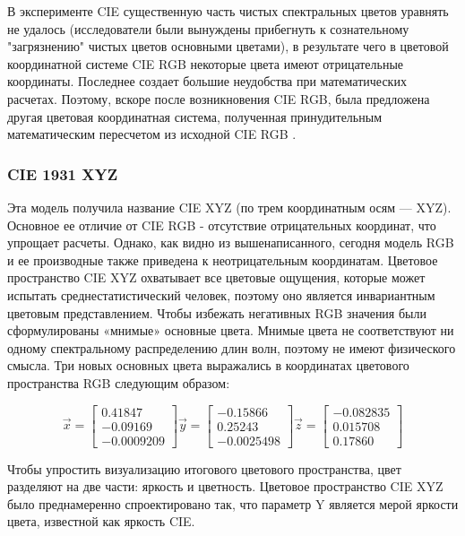 В эксперименте CIE существенную часть чистых спектральных цветов
уравнять не удалось (исследователи были вынуждены прибегнуть к сознательному
"загрязнению"  чистых цветов основными цветами), в результате чего в цветовой
координатной системе CIE RGB некоторые цвета имеют отрицательные координаты.
Последнее создает большие неудобства при математических расчетах. Поэтому, вскоре после возникновения CIE RGB, была предложена другая цветовая координатная система, полученная принудительным математическим пересчетом из исходной CIE RGB \cite{bib5}. 

\subsubsection{CIE 1931 XYZ}
Эта модель получила название CIE XYZ  (по трем координатным осям — XYZ). Основное ее отличие от CIE RGB - отсутствие отрицательных координат, что упрощает расчеты. Однако, как видно из вышенаписанного, сегодня модель RGB и ее производные также приведена к неотрицательным координатам.
Цветовое пространство CIE XYZ охватывает все цветовые ощущения, которые может испытать среднестатистический человек, поэтому оно является инвариантным цветовым представлением. Чтобы избежать негативных RGB значения были сформулированы «мнимые» основные цвета. Мнимые цвета не соответствуют ни одному спектральному распределению длин волн, поэтому не имеют физического смысла.  Три новых основных цвета выражались в координатах цветового пространства RGB следующим образом:

\begin{equation}
\overrightarrow{x} =  \begin{bmatrix} 0.41847 \\ -0.09169 \\ -0.0009209 \end{bmatrix}
\overrightarrow{y} =  \begin{bmatrix} -0.15866 \\ 0.25243 \\ -0.0025498 \end{bmatrix}
\overrightarrow{z} =  \begin{bmatrix} -0.082835 \\ 0.015708  \\ 0.17860 \end{bmatrix}
\end{equation}

Чтобы упростить визуализацию итогового цветового пространства, цвет разделяют на две части: яркость и цветность. Цветовое пространство CIE XYZ было преднамеренно спроектировано так, что параметр Y является мерой яркости цвета, известной как яркость CIE. 

